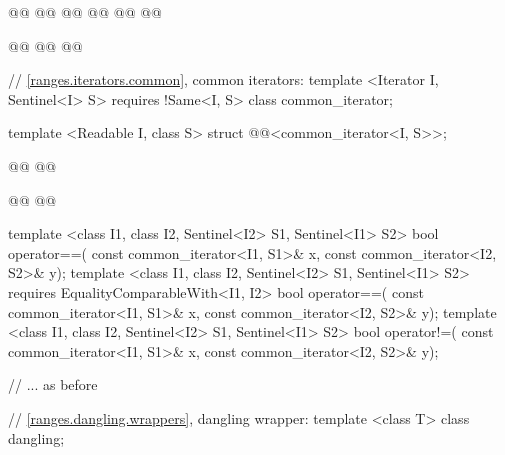\begin{codeblock}
{{    @@
      @@
        @@
    @@
      @@
        @@

    @@
    @@
      @@

    // \ref{ranges.iterators.common}, common iterators:
    template <Iterator I, Sentinel<I> S>
      requires !Same<I, S>
    class common_iterator;

    template <Readable I, class S>
    struct @@<common_iterator<I, S>>;

    @@
    @@

    @@
    @@

    template <class I1, class I2, Sentinel<I2> S1, Sentinel<I1> S2>
    bool operator==(
      const common_iterator<I1, S1>& x, const common_iterator<I2, S2>& y);
    template <class I1, class I2, Sentinel<I2> S1, Sentinel<I1> S2>
      requires EqualityComparableWith<I1, I2>
    bool operator==(
      const common_iterator<I1, S1>& x, const common_iterator<I2, S2>& y);
    template <class I1, class I2, Sentinel<I2> S1, Sentinel<I1> S2>
    bool operator!=(
      const common_iterator<I1, S1>& x, const common_iterator<I2, S2>& y);

    // ... as before

    // \ref{ranges.dangling.wrappers}, dangling wrapper:
    template <class T> class dangling;

}}
\end{codeblock}
